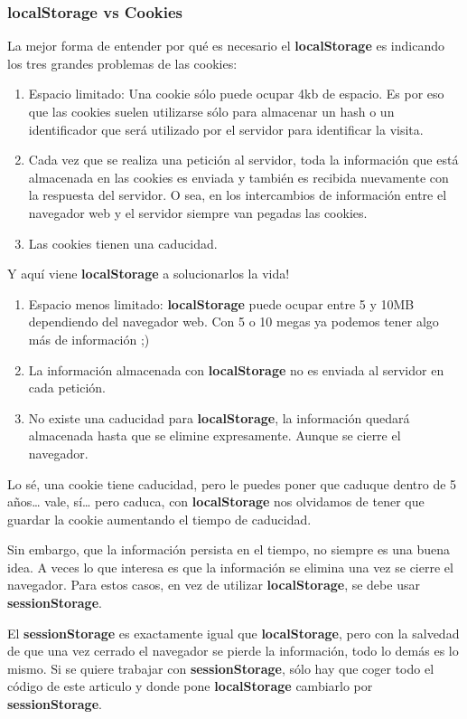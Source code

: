\documentclass{apuntes}
\begin{document}
\subsubsection{localStorage vs Cookies}
La mejor forma de entender por qué es necesario el \textbf{localStorage} es indicando los tres grandes problemas de las cookies:
\begin{enumerate}
\item Espacio limitado: Una cookie sólo puede ocupar 4kb de espacio. Es por eso que las cookies suelen utilizarse sólo para almacenar un hash o un identificador que será utilizado por el servidor para identificar la visita.
\item Cada vez que se realiza una petición al servidor, toda la información que está almacenada en las cookies es enviada y también es recibida nuevamente con la respuesta del servidor. O sea, en los intercambios de información entre el navegador web y el servidor siempre van pegadas las cookies.
\item Las cookies tienen una caducidad.
\end{enumerate}

Y aquí viene \textbf{localStorage} a solucionarlos la vida!

\begin{enumerate}
\item Espacio menos limitado: \textbf{localStorage} puede ocupar entre 5 y 10MB dependiendo del navegador web. Con 5 o 10 megas ya podemos tener algo más de información ;)
\item La información almacenada con \textbf{localStorage} no es enviada al servidor en cada petición.
\item No existe una caducidad para \textbf{localStorage}, la información quedará almacenada hasta que se elimine expresamente. Aunque se cierre el navegador.
\end{enumerate}

Lo sé, una cookie tiene caducidad, pero le puedes poner que caduque dentro de 5 años… vale, sí… pero caduca, con \textbf{localStorage} nos olvidamos de tener que guardar la cookie aumentando el tiempo de caducidad.

Sin embargo, que la información persista en el tiempo, no siempre es una buena idea. A veces lo que interesa es que la información se elimina una vez se cierre el navegador. Para estos casos, en vez de utilizar \textbf{localStorage}, se debe usar \textbf{sessionStorage}.

El \textbf{sessionStorage} es exactamente igual que \textbf{localStorage}, pero con la salvedad de que una vez cerrado el navegador se pierde la información, todo lo demás es lo mismo. Si se quiere trabajar con \textbf{sessionStorage}, sólo hay que coger todo el código de este articulo y donde pone \textbf{localStorage} cambiarlo por \textbf{sessionStorage}.
\end{document}

